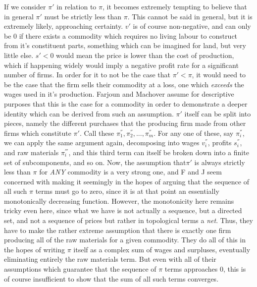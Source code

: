 \documentclass{article}
\theoremstyle{definition}
\theoremstyle{plain}
\theoremstyle{theorem}
\begin{document}
If we consider $\pi'$ in relation to $\pi$, it becomes extremely tempting to believe that in general $\pi'$ must be strictly less than $\pi$. This cannot be said in general, but it is extremely likely, approaching certainty. $v'$ is of course non-negative, and can only be $0$ if there exists a commodity which requires no living labour to construct from it's constituent parts, something which can be imagined for land, but very little else. $s' < 0$ would mean the price is lower than the cost of production, which if happening widely would imply a negative profit rate for a significant number of firms. In order for it to not be the case that $\pi' < \pi$, it would need to be the case that the firm sells their commodity at a loss, one which \textit{exceeds} the wages used in it's production. Farjoun and Machover assume for descriptive purposes that this is the case for a commodity in order to demonstrate a deeper identity which can be derived from such an assumption. $\pi'$ itself can be split into pieces, namely the different purchases that the producing firm made from other firms which constitute $\pi'$. Call these $\pi^{''}_1,\pi^{''}_2,...,\pi^{''}_{m}$. For any one of these, say $\pi^{''}_i$, we can apply the same argument again, decomposing into wages $v^{''}_i$, profits $s^{''}_i$, and raw materials $\pi^{'''}_i$, and this third term can itself be broken down into a finite set of subcomponents, and so on. Now, the assumption that$\pi'$ is always strictly less than $\pi$ for \textit{ANY} commodity is a very strong one, and F and J seem concerned with making it seemingly in the hopes of arguing that the sequence of all such $\pi$ terms must go to zero, since it is at that point an essentially monotonically decreasing function. However, the monotonicity here remains tricky even here, since what we have is not actually a sequence, but a directed set, and not a sequence of prices but rather in topological terms a \textit{net}. Thus, they have to make the rather extreme assumption that there is exactly one firm producing all of the raw materials for a given commodity. They do all of this in the hopes of writing $\pi$ itself as a complex sum of wages and surpluses, eventually eliminating entirely the raw materials term. But even with all of their assumptions which guarantee that the sequence of $\pi$ terms approaches $0$, this is of course insufficient to show that the sum of all such terms converges. \par 
\end{document}
